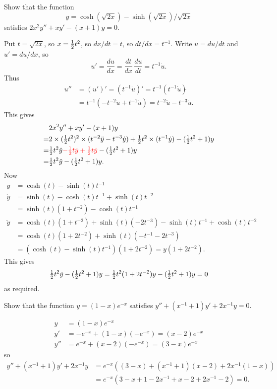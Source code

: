 \documentclass[a4paper]{amsart}
\begin{document}
\begin{exercise}\label{ex-cosh-sqrt}
 Show that the function 
 \[ y = \cosh(\sqrt{2x}) - \sinh(\sqrt{2x})/\sqrt{2x} \]
 satisfies $2x^2y''+xy'-(x+1)y=0$.
\end{exercise}
\begin{solution}
 Put $t=\sqrt{2x}$, so $x=\tfrac{1}{2} t^2$, so $dx/dt=t$, so $dt/dx=t^{-1}$.
 Write $\dot{u}=du/dt$ and $u'=du/dx$, so
 \[ u' = \frac{du}{dx} = \frac{dt}{dx}\,\frac{du}{dt} = t^{-1}\dot{u}.
 \] 
 Thus
 \begin{align*}
  u'' &= (u')' = (t^{-1}\dot{u})' = t^{-1}(t^{-1}\dot{u})\dot{ } \\
      &= t^{-1}(-t^{-2}\dot{u}+t^{-1}\ddot{u}) 
       = t^{-2}\ddot{u} - t^{-3}\dot{u}.
 \end{align*}
 This gives
 \begin{align*}
  & 2x^2y'' + xy' - (x+1)y \\
  =& 2\times(\tfrac{1}{2} t^2)^2\times(t^{-2}\ddot{y} - t^{-3}\dot{y})
     + \tfrac{1}{2} t^2\times(t^{-1}\dot{y}) - (\tfrac{1}{2} t^2+1)y \\
  =& \tfrac{1}{2} t^2\ddot{y} {\color{red}-\tfrac{1}{2} t\dot{y} + \tfrac{1}{2} t\dot{y}} - 
     (\tfrac{1}{2} t^2+1) y \\
  =& \tfrac{1}{2} t^2\ddot{y} - (\tfrac{1}{2} t^2+1) y.
 \end{align*}
 Now 
 \begin{align*}
  y &= \cosh(t) - \sinh(t)t^{-1} \\
  \dot{y} &= \sinh(t) - \cosh(t)t^{-1} + \sinh(t)t^{-2} \\
          &= \sinh(t)(1+t^{-2}) - \cosh(t)t^{-1} \\
  \ddot{y} &= \cosh(t)(1+t^{-2}) + \sinh(t)(-2t^{-3}) 
              -\sinh(t)t^{-1}+\cosh(t)t^{-2} \\
           &= \cosh(t)(1+2t^{-2}) + \sinh(t)(-t^{-1}-2t^{-3}) \\
           &= (\cosh(t)-\sinh(t)t^{-1})(1+2t^{-2}) 
            = y (1+2t^{-2}).
 \end{align*}
 This gives
 \[ \tfrac{1}{2} t^2\ddot{y} - (\tfrac{1}{2} t^2+1)y =
    \tfrac{1}{2} t^2(1+2t^{-2})y - (\tfrac{1}{2} t^2+1)y = 0 
 \]
 as required.
\end{solution}

\begin{exercise}\label{ex-check-a}
 Show that the function $y=(1-x)e^{-x}$ satisfies $y''+(x^{-1}+1)y'+2x^{-1}y=0$.
\end{exercise}
\begin{solution}
 \begin{align*}
  y &= (1-x)e^{-x} \\
  y' &= -e^{-x} + (1-x)(-e^{-x}) = (x-2)e^{-x} \\
  y'' &= e^{-x} + (x-2)(-e^{-x}) = (3-x)e^{-x}
 \end{align*}
 so 
 \begin{align*}
  y''+(x^{-1}+1)y'+2x^{-1}y
    &= e^{-x}((3-x) + (x^{-1}+1)(x-2) + 2x^{-1}(1-x)) \\
    &= e^{-x}(3-x+1-2x^{-1}+x-2+2x^{-1}-2) = 0.
 \end{align*}
\end{solution}
\end{document}

